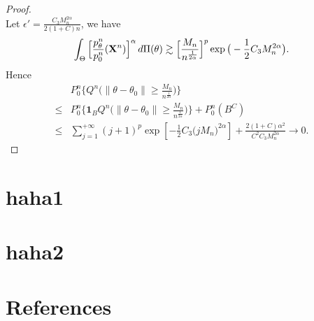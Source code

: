 \documentclass[11pt, letterpaper]{article}
\theoremstyle{plain}
\theoremstyle{definition}
\theoremstyle{remark}
\begin{document}
\begin{proof}
$$     $$
     Let $\epsilon'=\frac{C_3 M_n^{2\alpha}}{2(1+C)n}$, we have
     $$
     \int_{\Theta}\Big[\frac{p_{\theta}^n}{p_0^n}(\mathbf{X}^n)\Big]^{\alpha} \, d\Pi(\theta)
     \gtrsim \Big[\frac{M_n}{n^{\frac{1}{2\alpha}}}\Big]^p \exp \big(-\frac{1}{2} C_3 M_n^{2\alpha}\big).
     $$
     Hence 
     $$
     \begin{aligned}
         &P_0^n \Big\{ Q^n\big(\|\theta-\theta_0\|\geq \frac{M_n}{n^{\frac{1}{2\alpha}}}\big)\Big\}\\
         \leq&P_0^n \Big\{ \mathbf{1}_{B} Q^n\big( \|\theta-\theta_0\|\geq \frac{M_n}{n^{\frac{1}{2\alpha}}}\big)\Big\}+P_0^n (B^C)\\
         \leq& 
        \sum_{j=1}^{+\infty}
        (j+1)^p
         \exp[- \frac{1}{2}C_3 \Big({jM_n}\Big)^{2\alpha}]
         +
         \frac{2(1+C)\alpha^2}{C^2 C_3 M_n^{2\alpha}}\to 0.
     \end{aligned}
     $$
\end{proof}




\begin{appendices}
    \section{haha1}
    \section{haha2}
\end{appendices}


\section*{References}



\end{document}
